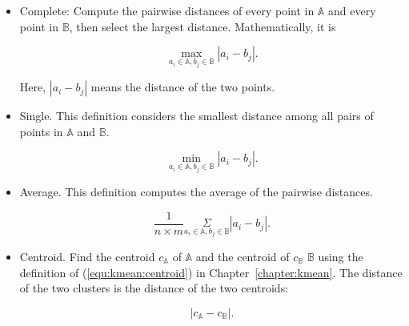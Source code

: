\begin{itemize}
\item Complete: Compute the pairwise distances of every point in
  $\mathds{A}$ and every point in $\mathds{B}$, then select the
  largest distance.  Mathematically, it is

  \begin{equation}
    \underset{a_i \in \mathds{A}, b_j \in \mathds{B}}{\max}
         {|a_i - b_j|}.
  \end{equation}

  Here, $|a_i - b_j|$ means the distance of the two points.

\item Single. This definition considers the smallest distance
  among all pairs of points in $\mathds{A}$ and $\mathds{B}$.
  
  \begin{equation}
    \underset{a_i \in \mathds{A}, b_j \in \mathds{B}}{\min}
         {|a_i - b_j|}.
  \end{equation}

\item Average. This definition computes the average of the pairwise
  distances.

  \begin{equation}
\frac{1}{n \times m}    \underset{a_i \in \mathds{A}, b_j \in \mathds{B}}{\Sigma}
         {|a_i - b_j|}.
  \end{equation}

\item Centroid. Find the centroid $c_{\mathds{A}}$ of $\mathds{A}$ and
  the centroid of $c_{\mathds{B}}$ $\mathds{B}$ using the definition
  of (\ref{equ:kmean:centroid}) in Chapter~\ref{chapter:kmean}.
  The distance of the two clusters is the distance of the two
  centroids:

  \begin{equation}
| c_{\mathds{A}} - c_{\mathds{B}} |.
    \end{equation}

  
\end{itemize}

\clearpage




